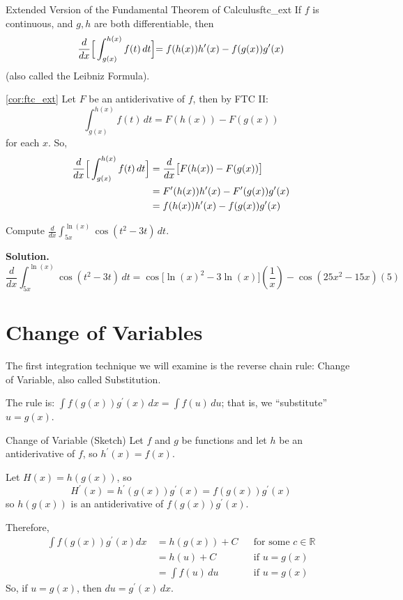 \begin{Corollary}{Extended Version of the Fundamental Theorem of Calculus}{ftc_ext}
    If $ f $ is continuous, and $ g, h $ are both differentiable, then
    \[ \frac{d}{dx}\Bigr[\int_{g(x)}^{h(x)} f(t)\, d{t} \Bigl]
        =f(h(x))h^\prime(x)-f(g(x))g^\prime(x) \]
    (also called the Leibniz Formula).
\end{Corollary}

\begin{Proof}{\ref{cor:ftc_ext}}{}
    Let $ F $ be an antiderivative of $ f $, then by FTC II\@:
    \[ \int_{g(x)}^{h(x)} f(t)\, d{t}=F(h(x))-F(g(x)) \]
    for each $ x $. So,
    \begin{align*}
        \frac{d}{dx}\Bigr[\int_{g(x)}^{h(x)} f(t)\, d{t} \Bigl]
         & =\frac{d}{dx}\bigl[F(h(x))-F(g(x))\bigr]             \\
         & =F^\prime(h(x))h^\prime(x)-F^\prime(g(x))g^\prime(x) \\
         & =f(h(x))h^\prime(x)-f(g(x))g^\prime(x)
    \end{align*}
\end{Proof}

\begin{Example}{}{}
    Compute $ \displaystyle \frac{d}{dx}\int_{5x}^{\ln(x)} \cos(t^2-3t)\, d{t} $.

    \textbf{Solution.}
    \[ \frac{d}{dx}\int_{5x}^{\ln(x)} \cos(t^2-3t)\, d{t}
        =\cos\bigl[\ln(x)^2-3\ln(x)\bigr]\left(\frac{1}{x}\right)-\cos(25x^2-15x)(5) \]
\end{Example}

\section{Change of Variables}
The first integration technique we will examine is the reverse chain rule:
Change of Variable, also called Substitution.

The rule is:
$ \displaystyle \int f(g(x))g^\prime(x)\, d{x}=\int f(u)\, d{u}  $;
that is, we ``substitute'' $ u=g(x) $.

\begin{Proof}{Change of Variable (Sketch)}{}
    Let $ f $ and $ g $ be functions and let $ h $ be an antiderivative of $ f $,
    so $ h^\prime(x)=f(x) $.

    Let $ H(x)=h(g(x)) $, so
    \[ H^\prime(x)=h^\prime(g(x))g^\prime(x)=f(g(x))g^\prime(x) \]
    so $ h(g(x)) $ is an antiderivative of $ f(g(x))g^\prime(x) $.

    Therefore,
    \begin{align*}
        \int f(g(x))g^\prime(x)d{x}\,
         & =h(g(x))+C        &  & \text{for some }c\in\mathbb{R} \\
         & =h(u)+C           &  & \text{if }u=g(x)               \\
         & =\int f(u)\, d{u} &  & \text{if }u=g(x)
    \end{align*}
    So, if $ u=g(x) $, then $ du=g^\prime(x)\,dx $.
\end{Proof}

